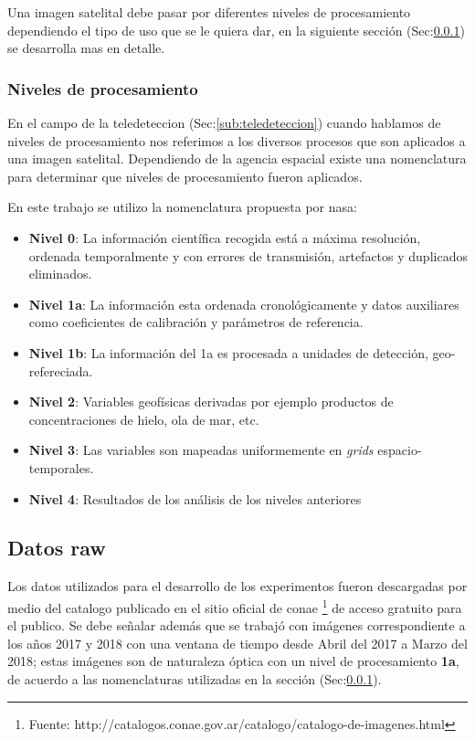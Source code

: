 Una imagen satelital debe pasar por diferentes niveles de procesamiento dependiendo el tipo de uso que se le quiera dar, en la siguiente sección (Sec:\ref{sub:nivelesdeprocesamiento}) se desarrolla mas en detalle.

\subsubsection{Niveles de procesamiento}\label{sub:nivelesdeprocesamiento}

En el campo de la teledeteccion (Sec:\ref{sub:teledeteccion}) cuando hablamos de niveles de procesamiento nos referimos a los diversos procesos que son aplicados a una imagen satelital. Dependiendo de la agencia espacial existe una nomenclatura para determinar que niveles de procesamiento fueron aplicados.

En este trabajo se utilizo la nomenclatura propuesta por \ac{nasa}:
\begin{itemize}
	\item \textbf{Nivel 0}: La información científica recogida está a máxima resolución, ordenada temporalmente y con errores de transmisión, artefactos y duplicados eliminados.
 	\item \textbf{Nivel 1a}: La información esta ordenada cronológicamente y datos auxiliares como coeficientes de calibración y parámetros de referencia.
 	\item \textbf{Nivel 1b}: La información del 1a es procesada a unidades de detección, geo-refereciada.
 	\item \textbf{Nivel 2}: Variables geofísicas derivadas por ejemplo productos de concentraciones de hielo, ola de mar, etc.
 	\item \textbf{Nivel 3}: Las variables son mapeadas uniformemente en \textit{grids} espacio-temporales.
 	\item \textbf{Nivel 4}: Resultados de los análisis de los niveles anteriores
\end{itemize}


\subsection{Datos raw}\label{sec:datosutilizados}

Los datos utilizados para el desarrollo de los experimentos fueron descargadas por medio del catalogo  publicado en el sitio oficial de \ac{conae} \footnote{Fuente: http://catalogos.conae.gov.ar/catalogo/catalogo-de-imagenes.html} de acceso gratuito para el publico. Se debe señalar además que se trabajó con imágenes correspondiente a los años 2017 y 2018 con una ventana de tiempo desde Abril del 2017 a Marzo del 2018; estas imágenes son de naturaleza óptica con un nivel de procesamiento \textbf{1a}, de acuerdo a las nomenclaturas utilizadas en la sección (Sec:\ref{sub:nivelesdeprocesamiento}).

